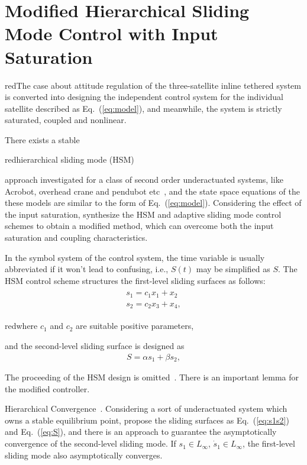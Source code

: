 \section{Modified Hierarchical Sliding Mode Control with Input Saturation}\label{sec:SMC}
\begin{color}{red}The case about attitude regulation of the three-satellite inline tethered system is converted into designing the independent control system for the individual satellite described as Eq.~(\ref{eq:model}), and meanwhile, the system is strictly saturated, coupled and nonlinear.\end{color} There exists a stable \begin{color}{red}hierarchical sliding mode (HSM)\end{color} approach investigated for a class of second order underactuated systems, like Acrobot, overhead crane and pendubot etc~\cite{wang2004design}, and the state space equations of the these models are similar to the form of Eq.~(\ref{eq:model}). Considering the effect of the input saturation, synthesize the HSM and adaptive sliding mode control schemes to obtain a modified method, which can overcome both the input saturation and coupling characteristics.\par
In the symbol system of the control system, the time variable is usually abbreviated if it won't lead to confusing, i.e., $S(t)$ may be simplified as $S$. The HSM control scheme structures the first-level sliding surfaces as follows:
\begin{align}
\begin{split}
s_1 = c_1x_1+x_2\\
s_2 = c_2x_3+x_4,
\end{split}\label{eq:s1s2}
\end{align}
\begin{color}{red}where $c_1$ and $c_2$ are suitable positive parameters,\end{color} and the second-level sliding surface is designed as
\begin{align}
S=\alpha s_1+\beta s_2\label{eq:S},
\end{align}\par
The proceeding of the HSM design is omitted~\cite{wang2004design}. There is an important lemma for the modified controller.
\begin{lemma}Hierarchical Convergence~\cite{wang2004design}.
Considering a sort of underactuated system which owns a stable equilibrium point, propose the sliding surfaces as Eq.~(\ref{eq:s1s2}) and Eq.~(\ref{eq:S}), and there is an approach to guarantee the asymptotically convergence of the second-level sliding mode. If $s_1\in L_\infty$, $\dot s_1\in L_\infty$, the first-level sliding mode also asymptotically converges.\label{lm:1}
\end{lemma}\par
